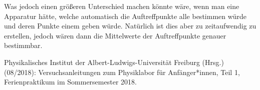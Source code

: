 \documentclass[11pt,a4paper]{article}
\begin{document}
Was jedoch einen gr\"o\ss eren Unterschied machen k\"onnte w\"are, wenn man eine Apparatur h\"atte, welche automatisch die Auftreffpunkte alle bestimmen w\"urde und deren Punkte einem geben w\"urde. Nat\"urlich ist dies aber zu zeitaufwendig zu erstellen, jedoch w\"aren dann die Mittelwerte der Auftreffpunkte genauer bestimmbar.

%
%


\begin{thebibliography}{9}
 Physikalisches Institut der Albert-Ludwigs-Universität Freiburg (Hrsg.) (08/2018): Versuchsanleitungen zum Physiklabor für Anfänger*innen, Teil 1, Ferienpraktikum im Sommersemester 2018.
\end{thebibliography}
\end{document}

